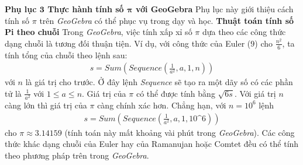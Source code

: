 \begin{multicols}{2}
\begin{figure}[H]
		\vspace*{-10pt}
	\end{figure}
	\textbf{\color{lichsutoanhoc}Phụ lục $\pmb{3}$ Thực hành tính số $\pmb{\pi}$  với GeoGebra}
	\vskip 0.1cm
	Phụ lục này giới thiệu cách tính số $\pi$ trên \textit{GeoGebra} có thể phục vụ trong dạy và học.
	\vskip 0.1cm
	\textbf{\color{lichsutoanhoc}Thuật toán tính số Pi theo chuỗi} Trong \textit{GeoGebra}, việc tính xấp xỉ số $\pi$ dựa theo các công thức dạng chuỗi là tương đối thuận tiện. Ví dụ, với công thức của Euler ($9$) cho $\frac{n^2}{6}$, ta tính tổng của chuỗi theo lệnh sau:
	\begin{align*}
		s = Sum\left( {Sequence\left( {\frac{1}{{{a^2}}},a,1,n} \right)} \right)
	\end{align*}
	với $n$ là giá trị cho trước. Ở đây lệnh \textit{Sequence} sẽ tạo ra một dãy số có các phần tử là $\frac{1}{a^2}$ với  $1 \le a \le n$. Giá trị của $\pi$  có thể được tính bằng $\sqrt{6s}$. Với giá trị $n$ càng lớn thì giá trị của $\pi$  càng chính xác hơn. Chẳng hạn, với $n = 10^6$  lệnh
	\begin{align*}
		s = Sum\left( {Sequence\left( {\frac{1}{{{a^2}}},a,1,10\^6} \right)} \right)
	\end{align*}
	cho $\pi \approx 3.14159$ (tính toán này mất khoảng vài phút trong \textit{GeoGebra}). Các công thức khác dạng chuỗi của Euler hay của Ramanujan hoặc Comtet đều có thể tính theo phương pháp trên trong \textit{GeoGebra}.

\end{multicols}
